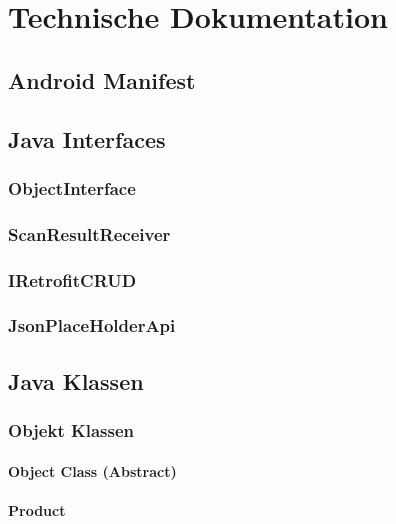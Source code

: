 \documentclass{scrartcl}
\begin{document}
\newpage

\section{Technische Dokumentation}

\subsection{Android Manifest}

\subsection{Java Interfaces}

\subsubsection{ObjectInterface}

\subsubsection{ScanResultReceiver}

\subsubsection{IRetrofitCRUD}

\subsubsection{JsonPlaceHolderApi}

\subsection{Java Klassen}

\subsubsection{Objekt Klassen}

\paragraph{Object Class (Abstract)}

\paragraph{Product}
\end{document}
